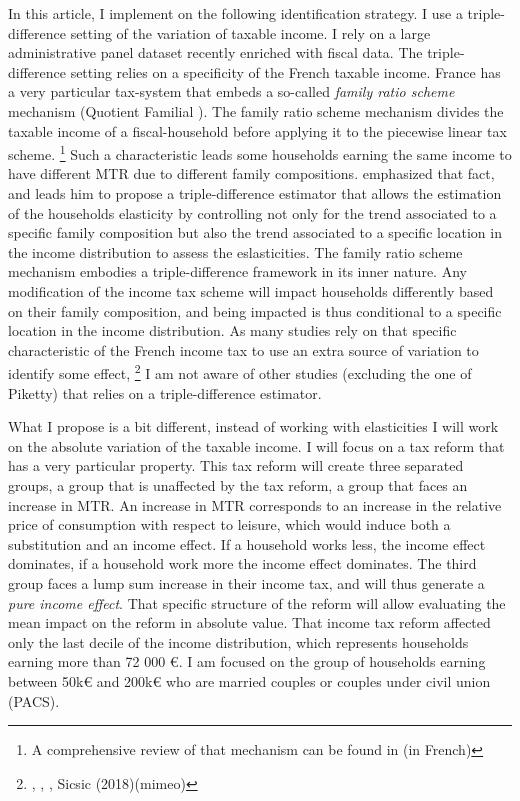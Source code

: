 In this article, I implement on the following identification strategy. I use a triple-difference setting of the variation of taxable income. I rely on a large administrative panel dataset recently enriched with fiscal data. The triple-difference setting relies on a specificity of the French taxable income. France has a very particular tax-system that embeds a so-called \emph{family ratio scheme} mechanism (Quotient Familial ). The family ratio scheme mechanism divides the taxable income of a fiscal-household before applying it to the piecewise linear tax scheme.
\footnote{ A comprehensive review of that mechanism can be found in \citet{carbonnier2016prise} (in French) }
 Such a characteristic leads some households earning the same income to have different MTR due to different family compositions. \citet{piketty1999hauts} emphasized that fact, and leads him to propose a triple-difference estimator that allows the estimation of the households elasticity by controlling not only for the trend associated to a specific family composition but also the trend associated to a specific location in the income distribution to assess the eslasticities. The family ratio scheme mechanism embodies a triple-difference framework in its inner nature.
Any modification of the income tax scheme will impact households differently based on their family composition, and being impacted is thus conditional to a specific location in the income distribution. As many studies rely on that  specific characteristic of the French income tax to use an extra source of variation to identify some effect,
\footnote{ \citet{carbonnier2014influence}, \citet{cabannes2014comment} , \citet{carbonnier2014savers}, Sicsic (2018)(mimeo) } I am not aware of other studies (excluding the one of Piketty) that relies on a triple-difference estimator.

What I propose is a bit different, instead of working with elasticities I will work on the absolute variation of the taxable income. I will focus on a tax reform that has a very particular property. This tax reform will create three separated groups, a group that is unaffected by the tax reform, a group that faces an increase in MTR. An increase in MTR corresponds to an increase in the relative price of consumption with respect to leisure, which would induce both a substitution and an income effect. If a household works less, the income effect dominates, if a household work more the income effect dominates.
The third group faces a lump sum increase in their income tax, and will thus generate a \emph{pure income effect}.  That specific structure of the reform will allow evaluating the mean impact on the reform in absolute value.
\medskip
That income tax reform affected only the last decile of the income distribution, which represents households earning more than 72 000 \euro{}. I am focused on the group of households earning between 50k\euro{} and 200k\euro{} who are married couples or couples under civil union (PACS).


